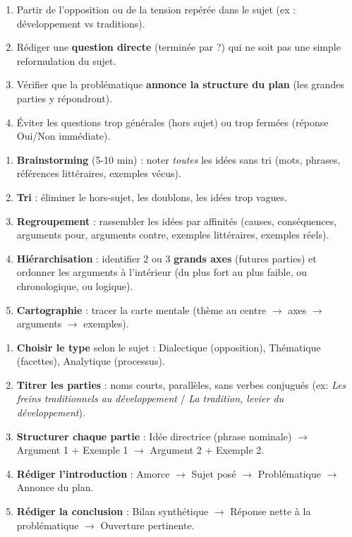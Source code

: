 \documentclass[11pt]{article}
\begin{document}
\begin{methode}
\begin{enumerate}
\item Partir de l'opposition ou de la tension repérée dans le sujet (ex : développement vs traditions).
\item Rédiger une \textbf{question directe} (terminée par ?) qui ne soit pas une simple reformulation du sujet.
\item Vérifier que la problématique \textbf{annonce la structure du plan} (les grandes parties y répondront).
\item Éviter les questions trop générales (hors sujet) ou trop fermées (réponse Oui/Non immédiate).
\end{enumerate}
\end{methode}

\begin{methode}
\begin{enumerate}
\item \textbf{Brainstorming} (5-10 min) : noter \emph{toutes} les idées sans tri (mots, phrases, références littéraires, exemples vécus).
\item \textbf{Tri} : éliminer le hors-sujet, les doublons, les idées trop vagues.
\item \textbf{Regroupement} : rassembler les idées par affinités (causes, conséquences, arguments pour, arguments contre, exemples littéraires, exemples réels).
\item \textbf{Hiérarchisation} : identifier 2 ou 3 \textbf{grands axes} (futures parties) et ordonner les arguments à l'intérieur (du plus fort au plus faible, ou chronologique, ou logique).
\item \textbf{Cartographie} : tracer la carte mentale (thème au centre $\rightarrow$ axes $\rightarrow$ arguments $\rightarrow$ exemples).
\end{enumerate}
\end{methode}

\begin{methode}
\begin{enumerate}
\item \textbf{Choisir le type} selon le sujet : Dialectique (opposition), Thématique (facettes), Analytique (processus).
\item \textbf{Titrer les parties} : noms courts, parallèles, sans verbes conjugués (ex: \emph{Les freins traditionnels au développement} / \emph{La tradition, levier du développement}).
\item \textbf{Structurer chaque partie} : Idée directrice (phrase nominale) $\rightarrow$ Argument 1 + Exemple 1 $\rightarrow$ Argument 2 + Exemple 2.
\item \textbf{Rédiger l'introduction} : Amorce $\rightarrow$ Sujet posé $\rightarrow$ Problématique $\rightarrow$ Annonce du plan.
\item \textbf{Rédiger la conclusion} : Bilan synthétique $\rightarrow$ Réponse nette à la problématique $\rightarrow$ Ouverture pertinente.
\end{enumerate}
\end{methode}
\end{document}
